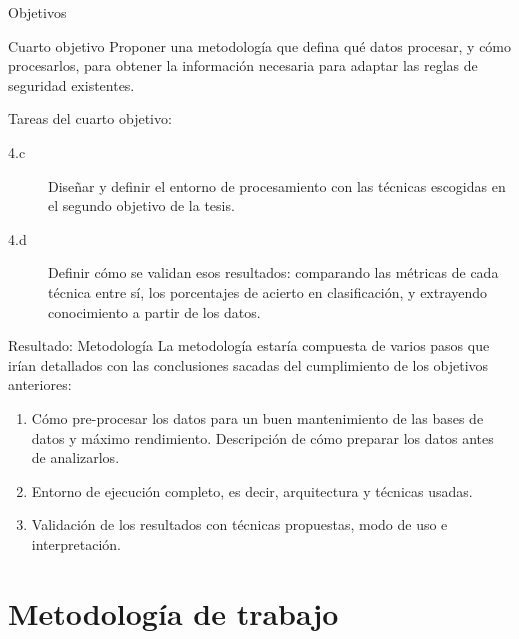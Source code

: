 \documentclass{beamer}
\begin{document}
\begin{frame}{Objetivos}

\begin{block}{Cuarto objetivo}
Proponer una metodología que defina qué datos procesar, y cómo procesarlos, para obtener la información necesaria para adaptar las reglas de seguridad existentes.
\end{block}

Tareas del cuarto objetivo:

\begin{small}
\begin{description}
  \item[4.c] Diseñar y definir el entorno de procesamiento con las técnicas escogidas en el segundo objetivo de la tesis.
  \item[4.d] Definir cómo se validan esos resultados: comparando las métricas de cada técnica entre sí, los porcentajes de acierto en clasificación, y extrayendo conocimiento a partir de los datos.
\end{description}
\end{small}

\end{frame}

\begin{frame}{Resultado: Metodología}
La metodología estaría compuesta de varios pasos que irían detallados con las conclusiones sacadas del cumplimiento de los objetivos anteriores:

\begin{enumerate}
  \item Cómo pre-procesar los datos para un buen mantenimiento de las bases de datos y máximo rendimiento. Descripción de cómo preparar los datos antes de analizarlos.
  \item Entorno de ejecución completo, es decir, arquitectura y técnicas usadas.
  \item Validación de los resultados con técnicas propuestas, modo de uso e interpretación.
\end{enumerate}

\end{frame}

\section{Metodología de trabajo}
\end{document}
